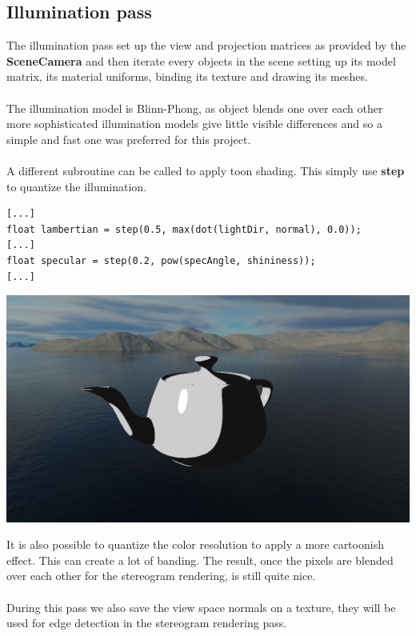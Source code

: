 \documentclass[12pt, a4paper]{article}
\begin{document}
\subsection{Illumination pass}
The illumination pass set up the view and projection matrices as provided by the \textbf{SceneCamera} and then iterate
every objects in the scene setting up its model matrix, its material uniforms, binding its texture and drawing its meshes.\\\\
The illumination model is Blinn-Phong, as object blends one over each other more sophisticated illumination models give little
visible differences and so a simple and fast one was preferred for this project.\\\\
A different subroutine can be called to apply toon shading. This simply use \textbf{step} to quantize the illumination.
\begin{lstlisting}[caption={Toon shading subroutine version},captionpos=b]
[...]
float lambertian = step(0.5, max(dot(lightDir, normal), 0.0));
[...]
float specular = step(0.2, pow(specAngle, shininess));
[...]
\end{lstlisting}
\begin{center}
    \centering
    \includegraphics[width=1.0\textwidth]{img/toon.png}
\end{center}
It is also possible to quantize the color resolution to apply a more cartoonish effect. This can create a lot
of banding. The result, once the pixels are blended over each other for the stereogram rendering, is still quite nice.\\\\
During this pass we also save the view space normals on a texture, they will be used for edge detection in the stereogram
rendering pass.
\end{document}

